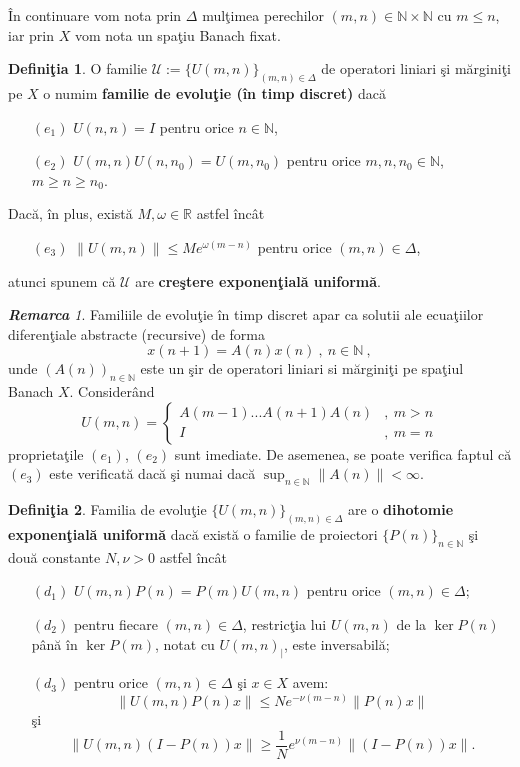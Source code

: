 \documentclass[ a4paper, 12pt]{report}
\newcommand{\R}{\mathbb{R}}
\newcommand{\N}{\mathbb{N}}
\newcommand{\defnemph}[1]{\textbf{#1}}
\theoremstyle{definition}
\newtheorem{definition}{\bf Defini\c tia}[section]
\theoremstyle{remark}
\newtheorem{remarc}{\bf Remarca}[section]
\numberwithin{equation}{section}
\begin{document}
\^In continuare vom nota prin $\Delta$ mul\c timea perechilor $(m, n) \in \mathbb{N}\times \mathbb{N}$ cu $m \leq n$, iar prin $X$ vom nota un spa\c tiu Banach fixat.

\begin{definition}
O familie $\mathcal{U}:=\{U(m,n)\}_{(m,n)\in\Delta}$ de operatori liniari \c si m\u argini\c ti  pe $X$ o numim
\defnemph{familie de evolu\c tie (\^in timp discret)} dac\u a
\begin{enumerate}
\item[$(e_1)$] $U(n,n)=I$ pentru orice $n\in\N$,
\item[$(e_2)$] $U(m,n)U(n,n_0)=U(m,n_0)$ pentru orice $m, n, n_0\in\N$, $m\geq n\geq n_0$.
\end{enumerate}
Dac\u a, \^in plus, exist\u a $M,\omega\in\R$ astfel \^inc\^at
\begin{enumerate}
\item[$(e_3)$] $\|U(m,n)\|\leq Me^{\omega(m-n)}$ pentru orice $(m,n)\in\Delta$,
\end{enumerate}
atunci spunem c\u a $\mathcal{U}$ are \defnemph{cre\c stere exponen\c tial\u a uniform\u a}.
\end{definition}

\begin{remarc}
Familiile de evolu\c tie \^in timp discret apar ca solutii ale ecua\c tiilor diferen\c tiale abstracte (recursive) de forma
\begin{equation}
\label{differenceeq}
x(n+1) = A(n) x(n)\ ,\ n\in\N\ ,
\end{equation}
unde $(A(n))_{n\in\N}$ este un \c sir de operatori liniari si m\u argini\c ti pe spa\c tiul Banach $X$.
Consider\^and
$$U(m,n)=
\begin{cases}
A(m-1)...A(n+1)A(n) &,\ m>n\\
I &,\ m=n
\end{cases}
 $$
proprieta\c tile $(e_1)$, $(e_2)$ sunt imediate.
De asemenea, se poate verifica faptul c\u a $(e_3)$ este verificat\u a dac\u a \c si numai dac\u a
$\sup_{n\in\N}\|A(n)\| <\infty$.
\end{remarc}


\begin{definition}
\label{expdichot}
Familia de evolu\c tie $\{U(m,n)\}_{(m,n)\in\Delta}$ are o \defnemph{dihotomie exponen\c tial\u a uniform\u a} dac\u a
exist\u a o familie de proiectori $\{P(n)\}_{n\in\N}$ \c si dou\u a constante $N,\nu>0$ astfel \^inc\^at
\begin{enumerate}
\item[$(d_1)$] $U(m,n)P(n)=P(m)U(m,n)$ pentru orice $(m,n)\in\Delta$;
\item[$(d_2)$] pentru fiecare $(m,n)\in\Delta$, restric\c tia lui
    $U(m,n)$ de la $\ker P(n)$ p\^an\u a \^in $\ker P(m)$, notat cu
    $U(m,n)_{|}$, este inversabil\u a;
\item[$(d_3)$] pentru orice $(m,n)\in\Delta$ \c si $x\in X$ avem:
$$\|U(m,n)P(n)x\|\leq Ne^{-\nu(m-n)}\|P(n)x\|$$ \c si $$\|U(m,n)(I-P(n))x\|\geq  \frac{1}{N}e^{\nu(m-n)}\|(I-P(n))x\|.$$
\end{enumerate}
\end{definition}
\end{document}
